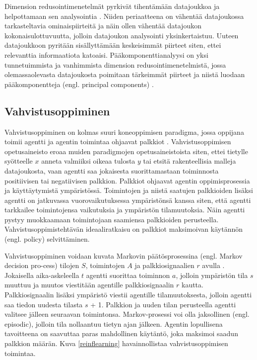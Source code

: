 \documentclass[utf8]{gradu3}
\begin{document}
Dimension redusointimenetelmät pyrkivät tihentämään datajoukkoa ja helpottamaan sen analysointia \parencite{usama2019unsupervised}. Niiden periaatteena on vähentää datajoukossa tarkasteltavia ominaispiirteitä ja näin ollen vähentää datajoukon kokonaisulottuvuutta, jolloin datajoukon analysointi yksinkertaistuu. Uuteen datajoukkoon pyritään sisällyttämään keskeisimmät piirteet siten, ettei relevanttia informaatiota katoaisi. Pääkomponenttianalyysi on yksi tunnetuimmista ja vanhimmista dimension redusointimenetelmistä, jossa olemassaolevasta datajoukosta poimitaan tärkeimmät piirteet ja niistä luodaan pääkomponentteja (engl. principal components) \parencite{abdi2010principal}.

\subsection{Vahvistusoppiminen}

Vahvistusoppiminen on kolmas suuri koneoppimisen paradigma, jossa oppijana toimii agentti ja agentin toimintaa ohjaavat palkkiot \parencite{arulkumaran2017brief,jordan2015machine,li2018deep}. Vahvistusoppimisen opetusaineisto eroaa muiden paradigmojen opetusaineistoista siten, ettei tietylle syötteelle \(x\) anneta valmiiksi oikeaa tulosta \(y\) tai etsitä rakenteellisia malleja datajoukosta, vaan agentti saa jokaisesta suorittamastaan toiminnosta positiivisen tai negatiivisen palkkion. Palkkiot ohjaavat agentin oppimisprosessia ja käyttäytymistä ympäristössä. Toimintojen ja niistä saatujen palkkioiden lisäksi agentti on jatkuvassa vuorovaikutuksessa ympäristönsä kanssa siten, että agentti tarkkailee toimintojensa vaikutuksia ja ympäristön tilamuutoksia. Näin agentti pystyy muokkaamaan toimintojaan saamiensa palkkioiden perusteella. Vahvistusoppimistehtävän ideaaliratkaisu on palkkiot maksimoivan käytännön (engl. policy) selvittäminen.

Vahvistusoppiminen voidaan kuvata Markovin päätösprosessina (engl. Markov decision pro-cess) tilojen \(S\), toimintojen \(A\) ja palkkiosignaalien \(r\) avulla \parencite{arulkumaran2017brief}. Jokaisella aika-askeleella \(t\) agentti suorittaa toiminnon \(a\), jolloin ympäristön tila \(s\) muuttuu ja muutos viestitään agentille palkkiosignaalin \(r\) kautta. Palkkiosignaalin lisäksi ympäristö viestii agentille tilamuutoksesta, jolloin agentti saa tiedon uudesta tilasta \(s\) + 1. Palkkion ja uuden tilan perusteella agentti valitsee jälleen seuraavan toimintonsa. Markov-prosessi voi olla jaksollinen (engl. episodic), jolloin tila nollaantuu tietyn ajan jälkeen. Agentin lopullisena tavoitteena on saavuttaa paras mahdollinen käytäntö, joka maksimoi saadun palkkion määrän. Kuva \ref{reinflearning} havainnollistaa vahvistusoppimisen toimintaa.
\end{document}
